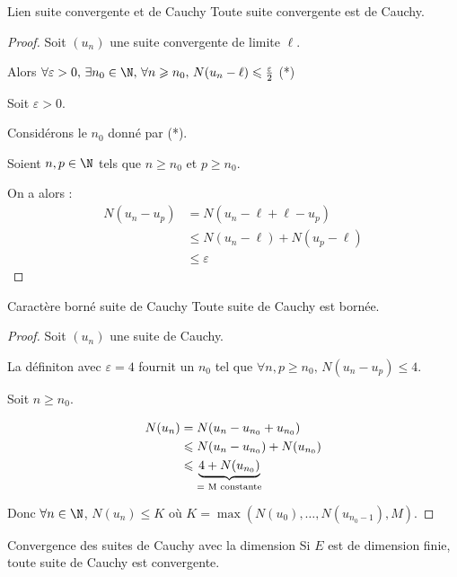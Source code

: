\begin{proposition}{Lien suite convergente et de Cauchy}{}
    Toute suite convergente est de Cauchy.
\end{proposition}

\begin{proof}
    Soit $(u_n)$ une suite convergente de limite $\ell$.

    Alors $\forall \varepsilon > 0, \, \exists n_0 \in \N, \, \forall n \geqslant n_0, \, N(u_n - \ell) \leqslant \frac \varepsilon 2$ (*)

    Soit $\varepsilon > 0$. 

    Considérons le $n_0$ donné par (*). 

    Soient $n, p \in \N$ tels que $n \geqslant n_0$ et $p \geqslant n_0$.

    On a alors : 
    \begin{align*}
        N(u_n - u_p) & = N(u_n - \ell + \ell - u_p) \\
        & \leqslant N(u_n - \ell) + N(u_p - \ell) \\
        & \leqslant \varepsilon
    \end{align*}
\end{proof}

\begin{proposition}{Caractère borné suite de Cauchy}{}
    Toute suite de Cauchy est bornée. 
\end{proposition}

\begin{proof}
    Soit $(u_n)$ une suite de Cauchy.

    La définiton avec $\varepsilon = 4$ fournit un $n_0$ tel que $\forall n, p \geqslant n_0, \, N(u_n - u_p) \leqslant 4$.

    Soit $n \geqslant n_0$. 

    \begin{align*}
        N(u_n) & = N(u_n - u_{n_0} + u_{n_0}) \\
        & \leqslant N(u_n - u_{n_0}) + N(u_{n_0}) \\
        & \leqslant  \underbrace{4 + N(u_{n_0})}_{\text{= M \text{constante}}}
    \end{align*}

    Donc $\forall n \in \N$, $N(u_n) \leqslant K$ où $K = \max( N(u_0), \ldots, N(u_{n_0 - 1}), M)$.
\end{proof}

\begin{theoreme}{Convergence des suites de Cauchy avec la dimension}{}
    Si $E$ est de dimension finie, toute suite de Cauchy est convergente. 
\end{theoreme}

